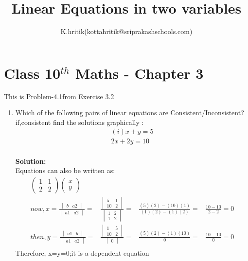 \documentclass[12pt]{article}
\title{Linear Equations in two variables }
\author{K.hritik(kottahritik@sriprakashschools.com)}
\newcommand{\myvec}[1]{\ensuremath{\begin{pmatrix}#1\end{pmatrix}}}
\newcommand{\mydet}[1]{\ensuremath{\begin{vmatrix}#1\end{vmatrix}}}
\newcommand{\solution}{\noindent \textbf{Solution: }}
\begin{document}
\maketitle
\section*{Class 10$^{th}$ Maths - Chapter 3}
This is Problem-4.1from Exercise 3.2
\begin{enumerate}
\item Which of the following pairs of linear equations are Consistent/Inconsistent?if,consistent find the solutions graphically :\\
\begin{align}
    (i)x+y=5\\
         2x+2y=10 \\ 
\end{align}
      
\solution \\
            Equations  can also be written as:\\     
\begin{align}
\myvec{1&1\\2&2}\myvec{x\\y}\\
now,x=\frac{\mydet{ b & a2}}{\mydet{ a1 & a2}} =&
\frac{\mydet{ 5 & 1 \\ 10 & 2}}{\mydet{1&2\\1&2}} =&
\frac{(5)(2)-(10)(1)}{(1)(2)-(1)(2)} =&
\frac{10-10}{2-2} = 0 \\
then,y=\frac{\mydet{a1&b}}{\mydet{a1&a2}} =&
\frac{\mydet{1&5\\10&2}}{\mydet{0}} =&
\frac{(5)(2)-(1)(10)}{0} =&
\frac{10-10}{0} = 0\\
\end{align}
Therefore, x=y=0;it is a dependent equation

	

\end{enumerate}
\end{document}
